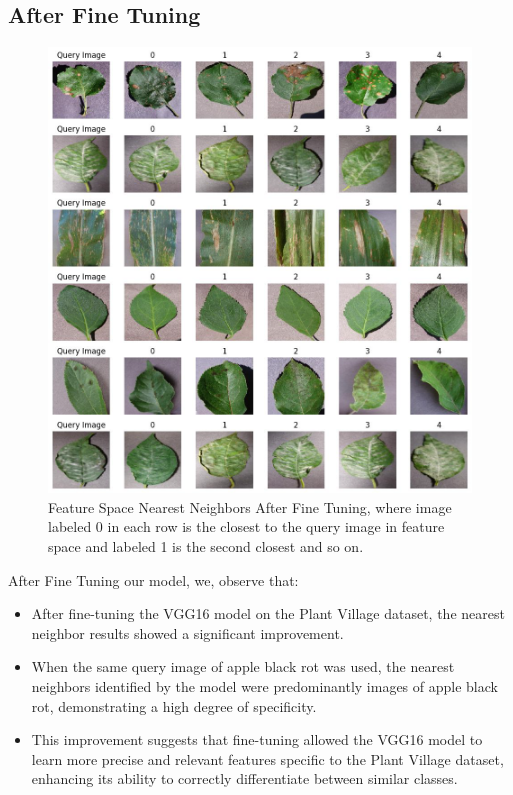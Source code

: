 \subsection{After Fine Tuning}
\begin{figure}
    \centering
    \includegraphics[width=1\linewidth]{graphics//chapter7/query after fine tuning.png}
    \caption{Feature Space Nearest Neighbors After Fine Tuning, where image labeled 0 in each row is the closest to the query image in feature space and labeled 1 is the second closest and so on.}
    \label{fig:query-aft}
\end{figure}
After Fine Tuning our model, we, observe that:
\begin{itemize}
    \item After fine-tuning the VGG16 model on the Plant Village dataset, the nearest neighbor results showed a significant improvement.
    \item When the same query image of apple black rot was used, the nearest neighbors identified by the model were predominantly images of apple black rot, demonstrating a high degree of specificity.
    \item This improvement suggests that fine-tuning allowed the VGG16 model to learn more precise and relevant features specific to the Plant Village dataset, enhancing its ability to correctly differentiate between similar classes.
\end{itemize}

